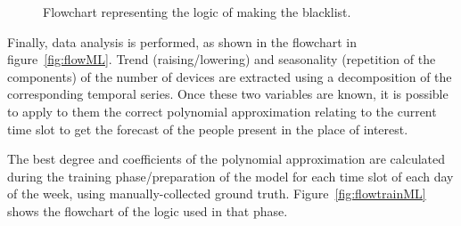 \begin{figure}
\begin{minipage}[b]{8.5cm}
\caption{Flowchart representing the logic of making the blacklist.}
\label{fig:flowblacklist}
\end{minipage}
\end{figure}

Finally, data analysis is performed, as shown in the flowchart in figure~\ref{fig:flowML}. Trend (raising/lowering) and seasonality (repetition of the components) of the number of devices are extracted using a decomposition of the corresponding temporal series. Once these two variables are known, it is possible to apply to them the correct polynomial approximation relating to the current time slot to get the forecast of the people present in the place of interest.

The best degree and coefficients of the polynomial approximation are calculated during the training phase/preparation of the model for each time slot of each day of the week, using manually-collected ground truth. Figure~\ref{fig:flowtrainML} shows the flowchart of the logic used in that phase.



